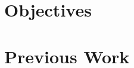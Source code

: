 \documentclass{beamer}
\newcommand{\tss}{\textsuperscript}
\begin{document}





\section{Objectives}




\section{Previous Work}
\begin{frame}
\sectionpage
\end{frame}
\end{document}

